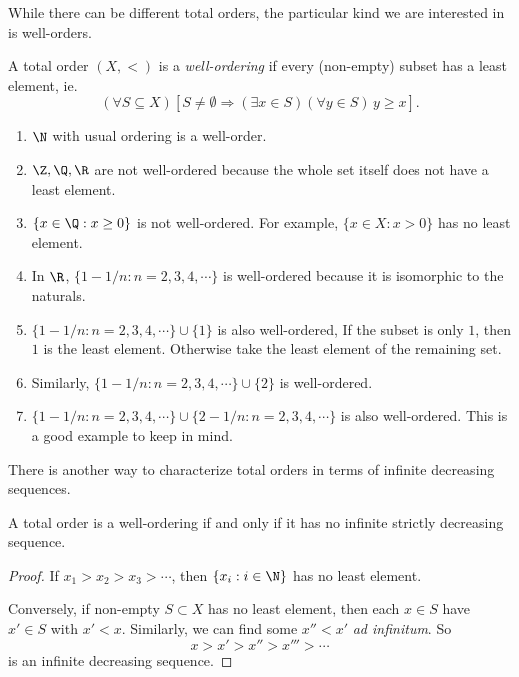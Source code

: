 \documentclass[a4paper]{article}
\begin{document}
While there can be different total orders, the particular kind we are interested in is well-orders.
\begin{defi}
  A total order $(X, <)$ is a \emph{well-ordering} if every (non-empty) subset has a least element, ie.
  \[
    (\forall S\subseteq X)[S\not= \emptyset \Rightarrow (\exists x\in S)(\forall y\in S)\, y \geq x].
  \]
\end{defi}

\begin{eg}\leavevmode
  \begin{enumerate}
    \item $\N$ with usual ordering is a well-order.
    \item $\Z, \Q, \R$ are not well-ordered because the whole set itself does not have a least element.
    \item $\{x\in \Q: x\geq 0\}$ is not well-ordered. For example, $\{x\in X: x> 0\}$ has no least element.
    \item In $\R$, $\{1 - 1/n: n = 2, 3, 4, \cdots\}$ is well-ordered because it is isomorphic to the naturals.
    \item $\{1 - 1/n: n = 2, 3, 4, \cdots\} \cup \{1\}$ is also well-ordered, If the subset is only $1$, then $1$ is the least element. Otherwise take the least element of the remaining set.
    \item Similarly, $\{1 - 1/n: n = 2, 3, 4, \cdots\}\cup \{2\}$ is well-ordered.
    \item $\{1 - 1/n: n = 2, 3, 4, \cdots\} \cup \{2 - 1/n: n = 2, 3, 4, \cdots\}$ is also well-ordered. This is a good example to keep in mind.
  \end{enumerate}
\end{eg}

There is another way to characterize total orders in terms of infinite decreasing sequences.
\begin{prop}
  A total order is a well-ordering if and only if it has no infinite strictly decreasing sequence.
\end{prop}

\begin{proof}
  If $x_1 > x_2 > x_3 > \cdots$, then $\{x_i: i\in \N\}$ has no least element.

  Conversely, if non-empty $S\subset X$ has no least element, then each $x\in S$ have $x'\in S$ with $x' < x$. Similarly, we can find some $x'' < x'$ \emph{ad infinitum}. So
  \[
    x > x' > x'' > x''' > \cdots
  \]
  is an infinite decreasing sequence.
\end{proof}
\end{document}
